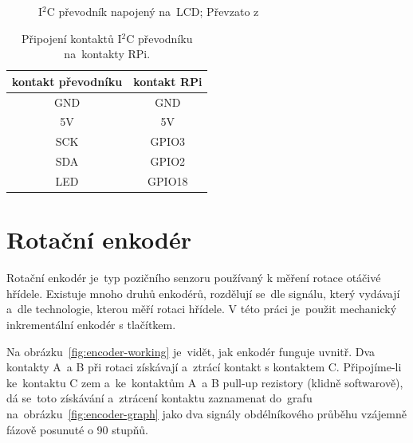 \begin{figure}[htb]
\begin{minipage}{0.45\textwidth}
    \caption{\label{fig:LCD_back} I$^{2}$C převodník napojený na~LCD; Převzato z~\cite{laskakit-LCD}}
  \end{minipage}
\end{figure}

\begin{table}[htb]
  \centering
  \begin{tabular}{c|c}
    kontakt převodníku & kontakt RPi \\
    \hline
    GND                & GND         \\
    5V                 & 5V          \\
    SCK                & GPIO3       \\
    SDA                & GPIO2       \\
    LED                & GPIO18      \\
  \end{tabular}
  \caption{\label{tab:LCD_conn} Připojení kontaktů I$^{2}$C převodníku na~kontakty RPi.}
\end{table}


\section{Rotační enkodér~\cite{how-encoders-work}\cite{rotary-encoder-cvut}}
Rotační enkodér je~typ pozičního senzoru používaný k měření rotace otáčivé hřídele. Existuje mnoho druhů enkodérů, rozdělují se~dle signálu, který vydávají a~dle technologie, kterou měří rotaci hřídele. V této práci je~použit mechanický inkrementální enkodér s tlačítkem.

Na obrázku~\ref{fig:encoder-working} je~vidět, jak enkodér funguje uvnitř. Dva kontakty A~a B při rotaci získávají a~ztrácí kontakt s kontaktem C. Připojíme-li ke~kontaktu C zem a~ke~kontaktům A~a B pull-up rezistory (klidně softwarově), dá se~toto získávání a~ztrácení kontaktu zaznamenat do~grafu na~obrázku~\ref{fig:encoder-graph} jako dva signály obdélníkového průběhu vzájemně fázově posunuté o 90 stupňů.

